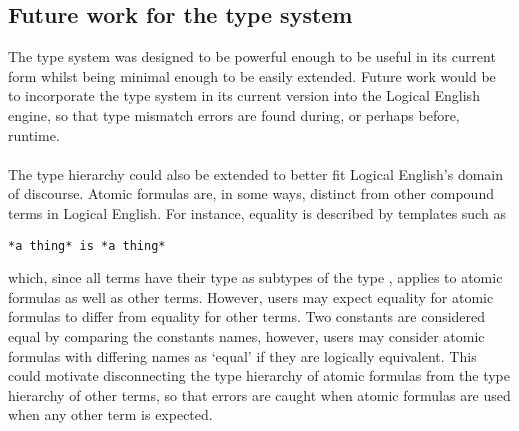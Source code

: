 \documentclass[../main.tex]{subfiles}
\begin{document}
\subsection{Future work for the type system}
The type system was designed to be powerful enough to be useful in its current form whilst being minimal enough to be easily extended. Future work would be to incorporate the type system in its current version into the Logical English engine, so that type mismatch errors are found during, or perhaps before, runtime. 
\\
\\
The type hierarchy could also be extended to better fit Logical English's domain of discourse. Atomic formulas are, in some ways, distinct from other compound terms in Logical English. For instance, equality is described by templates such as 
\begin{lstlisting}[language=LE]
    *a thing* is *a thing*
\end{lstlisting}
which, since all terms have their type as subtypes of the type , applies to atomic formulas as well as other terms. However, users may expect equality for atomic formulas to differ from equality for other terms. Two constants are considered equal by comparing the constants names, however, users may consider atomic formulas with differing names as `equal' if they are logically equivalent. This could motivate disconnecting the type hierarchy of atomic formulas from the type hierarchy of other terms, so that errors are caught when atomic formulas are used when any other term is expected.
\end{document}
